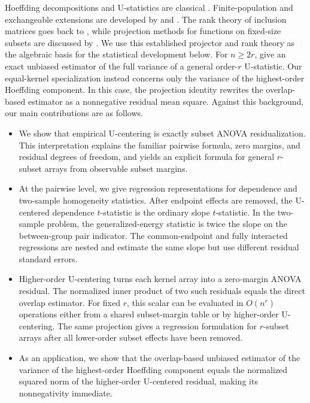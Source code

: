 \documentclass[11pt]{article}
\theoremstyle{plain}
\theoremstyle{definition}
\theoremstyle{remark}
\begin{document}
Hoeffding decompositions and U-statistics are classical
\citep{Hoeffding1948,Serfling1980}.  Finite-population and exchangeable
extensions are developed by \citet{BloznelisGotze2001} and
\citet{Peccati2004}.  The rank theory of inclusion matrices goes back to
\citet{Gottlieb1966}, while projection methods for functions on fixed-size
subsets are discussed by \citet{Dunkl1978,Filmus2016}.  We use this established
projector and rank theory as the algebraic basis for the statistical
development below.  For $n\ge 2r$, \citet[Theorem~1]{WangLindsay2014} give an
exact unbiased estimator of the full variance of a general order-$r$
U-statistic.  Our equal-kernel specialization instead concerns only the
variance of the highest-order Hoeffding component.  In this case, the
projection identity rewrites the overlap-based estimator as a nonnegative
residual mean square.
Against this background, our main contributions are as follows.
\begin{itemize}
\item We show that empirical U-centering is exactly subset ANOVA
residualization.  This interpretation explains the familiar pairwise formula,
zero margins, and residual degrees of freedom, and yields an explicit formula
for general $r$-subset arrays from observable subset margins.
\item At the pairwise level, we give regression representations for dependence
and two-sample homogeneity statistics.  After endpoint effects are removed,
the U-centered dependence $t$-statistic is the ordinary slope $t$-statistic.
In the two-sample problem, the generalized-energy statistic is twice the slope
on the between-group pair indicator.  The common-endpoint and fully interacted
regressions are nested and estimate the same slope but use different residual
standard errors.
\item Higher-order U-centering turns each kernel array into a zero-margin ANOVA
residual.  The normalized inner product of two such residuals equals the direct
overlap estimator.  For fixed $r$, this scalar can be evaluated in $O(n^r)$
operations either from a shared subset-margin table or by higher-order
U-centering.  The same projection gives a regression formulation for
$r$-subset arrays after all lower-order subset effects have been removed.
\item As an application, we show that the overlap-based unbiased estimator of
the variance of the highest-order Hoeffding component equals the normalized
squared norm of the higher-order U-centered residual, making its
nonnegativity immediate.
\end{itemize}
\end{document}
